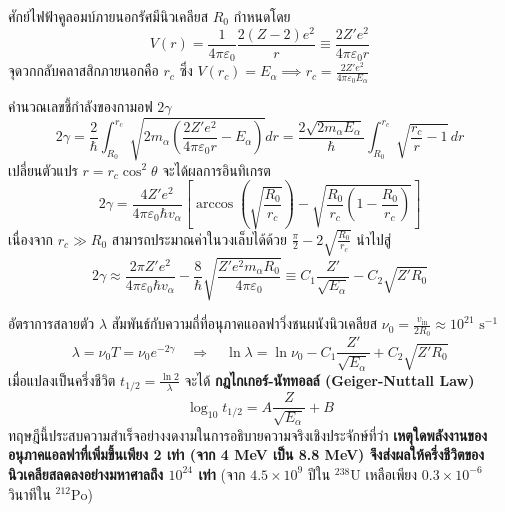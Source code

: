 ศักย์ไฟฟ้าคูลอมบ์ภายนอกรัศมีนิวเคลียส $R_0$ กำหนดโดย
\begin{equation}
V(r) = \frac{1}{4\pi\varepsilon_0} \frac{2(Z - 2)e^2}{r} \equiv \frac{2 Z' e^2}{4\pi\varepsilon_0 r}
\end{equation}
จุดวกกลับคลาสสิกภายนอกคือ $r_c$ ซึ่ง $V(r_c) = E_\alpha \implies r_c = \frac{2 Z' e^2}{4\pi\varepsilon_0 E_\alpha}$

คำนวณเลขชี้กำลังของกามอฟ $2\gamma$
\begin{equation}
2\gamma = \frac{2}{\hbar} \int_{R_0}^{r_c} \sqrt{2m_\alpha \left( \frac{2Z' e^2}{4\pi\varepsilon_0 r} - E_\alpha \right)} dr = \frac{2\sqrt{2m_\alpha E_\alpha}}{\hbar} \int_{R_0}^{r_c} \sqrt{\frac{r_c}{r} - 1} \, dr
\end{equation}
เปลี่ยนตัวแปร $r = r_c \cos^2\theta$ จะได้ผลการอินทิเกรต
\begin{equation}
2\gamma = \frac{4 Z' e^2}{4\pi\varepsilon_0 \hbar v_\alpha} \left[ \arccos\left(\sqrt{\frac{R_0}{r_c}}\right) - \sqrt{\frac{R_0}{r_c}\left(1 - \frac{R_0}{r_c}\right)} \right]
\end{equation}
เนื่องจาก $r_c \gg R_0$ สามารถประมาณค่าในวงเล็บได้ด้วย $\frac{\pi}{2} - 2\sqrt{\frac{R_0}{r_c}}$ นำไปสู่
\begin{equation}
2\gamma \approx \frac{2\pi Z' e^2}{4\pi\varepsilon_0 \hbar v_\alpha} - \frac{8}{\hbar}\sqrt{\frac{Z' e^2 m_\alpha R_0}{4\pi\varepsilon_0}} \equiv C_1 \frac{Z'}{\sqrt{E_\alpha}} - C_2 \sqrt{Z' R_0}
\end{equation}

อัตราการสลายตัว $\lambda$ สัมพันธ์กับความถี่ที่อนุภาคแอลฟาวิ่งชนผนังนิวเคลียส $\nu_0 = \frac{v_{\text{in}}}{2R_0} \approx 10^{21}\text{ s}^{-1}$
\begin{equation}
\lambda = \nu_0 T = \nu_0 e^{-2\gamma} \quad \Longrightarrow \quad \ln\lambda = \ln\nu_0 - C_1 \frac{Z'}{\sqrt{E_\alpha}} + C_2 \sqrt{Z' R_0}
\end{equation}
เมื่อแปลงเป็นครึ่งชีวิต $t_{1/2} = \frac{\ln 2}{\lambda}$ จะได้ \textbf{กฎไกเกอร์-นัททอลล์ (Geiger-Nuttall Law)}
\begin{equation}
\log_{10} t_{1/2} = A \frac{Z}{\sqrt{E_\alpha}} + B
\end{equation}
ทฤษฎีนี้ประสบความสำเร็จอย่างงดงามในการอธิบายความจริงเชิงประจักษ์ที่ว่า \textbf{เหตุใดพลังงานของอนุภาคแอลฟาที่เพิ่มขึ้นเพียง 2 เท่า (จาก 4 MeV เป็น 8.8 MeV) จึงส่งผลให้ครึ่งชีวิตของนิวเคลียสลดลงอย่างมหาศาลถึง $10^{24}$ เท่า} (จาก $4.5 \times 10^9$ ปีใน $^{238}\text{U}$ เหลือเพียง $0.3\times 10^{-6}$ วินาทีใน $^{212}\text{Po}$)

